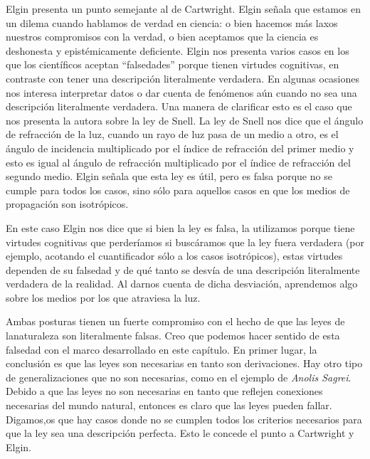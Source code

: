 Elgin presenta un punto semejante al de Cartwright. Elgin \citeyear{Elgin2004} señala que estamos en un dilema cuando hablamos de verdad en ciencia: o bien hacemos más laxos nuestros compromisos con la verdad, o bien aceptamos que la ciencia es deshonesta y epistémicamente deficiente. Elgin nos presenta varios casos en los que los científicos aceptan ``falsedades'' porque tienen virtudes cognitivas, en contraste con tener una descripción literalmente verdadera. En algunas ocasiones nos interesa interpretar datos o dar cuenta de fenómenos aún cuando no sea una descripción literalmente verdadera. Una manera de clarificar esto es el caso que nos presenta la autora sobre la ley de Snell. La ley de Snell nos dice que el ángulo de refracción de la luz, cuando un rayo de luz pasa de un medio a otro, es el ángulo de incidencia multiplicado por el índice de refracción del primer medio y esto es igual al ángulo de refracción multiplicado por el índice de refracción del segundo medio. Elgin señala que esta ley es útil, pero es falsa porque no se cumple para todos los casos, sino sólo para aquellos casos en que los medios de propagación son isotrópicos.

En este caso Elgin nos dice que si bien la ley es falsa, la utilizamos porque tiene virtudes cognitivas que perderíamos si buscáramos que la ley fuera verdadera (por ejemplo, acotando el cuantificador sólo a los casos isotrópicos), estas virtudes dependen de su falsedad y de qué tanto se desvía de una descripción literalmente verdadera de la realidad. Al darnos cuenta de dicha desviación, aprendemos algo sobre los medios por los que atraviesa la luz.


Ambas posturas tienen un fuerte compromiso con el hecho de que las leyes de lanaturaleza son literalmente falsas. Creo que podemos hacer sentido de esta falsedad con el marco desarrollado en este capítulo. En primer lugar, la conclusión es que las leyes son necesarias en tanto son derivaciones. Hay otro tipo de generalizaciones que no son necesarias, como en el ejemplo de \emph{Anolis Sagrei}. Debido a que las leyes no son necesarias en tanto que reflejen conexiones necesarias del mundo natural, entonces es claro que las leyes pueden fallar. Digamos,os que hay casos donde no se cumplen todos los criterios necesarios para que la ley sea una descripción perfecta. Esto le concede el punto a Cartwright y Elgin.

